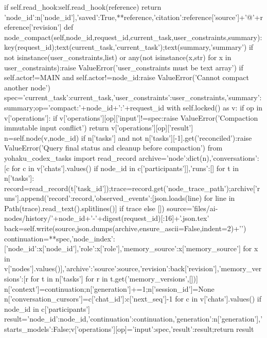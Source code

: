   if self.read_hook:self.read_hook(reference)
  return {'node_id':n['node_id'],'saved':True,**reference,'citation':reference['source']+'@'+reference['revision']}
 def node_compact(self,node_id,request_id,current_task,user_constraints,summary):
  key(request_id);text(current_task,'current_task');text(summary,'summary')
  if not isinstance(user_constraints,list) or any(not isinstance(x,str) for x in user_constraints):raise ValueError('user_constraints must be text array')
  if self.actor!=MAIN and self.actor!=node_id:raise ValueError('Cannot compact another node')
  spec={'current_task':current_task,'user_constraints':user_constraints,'summary':summary};op='compact:'+node_id+':'+request_id
  with self.locked() as v:
   if op in v['operations']:
    if v['operations'][op]['input']!=spec:raise ValueError('Compaction immutable input conflict')
    return v['operations'][op]['result']
   n=self.node(v,node_id)
   if n['tasks'] and not n['tasks'][-1].get('reconciled'):raise ValueError('Query final status and cleanup before compaction')
   from yohaku_codex_tasks import read_record
   archive={'node':dict(n),'conversations':[c for c in v['chats'].values() if node_id in c['participants']],'runs':[]}
   for t in n['tasks']:
    record=read_record(t['task_id']);trace=record.get('node_trace_path');archive['runs'].append({'record':record,'observed_events':[json.loads(line) for line in Path(trace).read_text().splitlines()] if trace else []})
   source='files/ai-nodes/history/'+node_id+'-'+digest(request_id)[:16]+'.json.tex'
   back=self.write(source,json.dumps(archive,ensure_ascii=False,indent=2)+'\n')
   continuation={**spec,'node_index':[{'node_id':x['node_id'],'role':x['role'],'memory_source':x['memory_source']} for x in v['nodes'].values()],'archive':{'source':source,'revision':back['revision']},'memory_versions':[r for t in n['tasks'] for r in t.get('memory_versions',[])]}
   n['context']=continuation;n['generation']+=1;n['session_id']=None
   n['conversation_cursors']={c['chat_id']:c['next_seq']-1 for c in v['chats'].values() if node_id in c['participants']}
   result={'node_id':node_id,'continuation':continuation,'generation':n['generation'],'starts_models':False};v['operations'][op]={'input':spec,'result':result};return result

